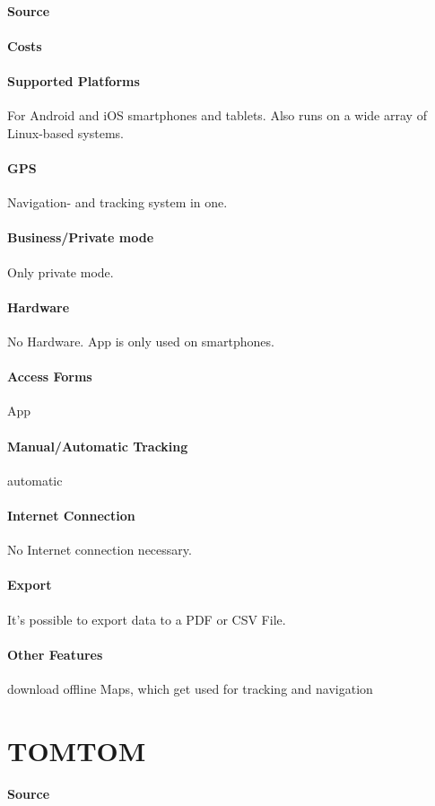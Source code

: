 \paragraph{Source} 
\paragraph{Costs} 
\paragraph{Supported Platforms} For Android and iOS smartphones and tablets. Also runs on a wide array of Linux-based systems.
\paragraph{GPS} Navigation- and tracking  system in one.
\paragraph{Business/Private mode} Only private mode.
\paragraph{Hardware} No Hardware. App is only used on smartphones.
\paragraph{Access Forms} App
\paragraph{Manual/Automatic Tracking} automatic
\paragraph{Internet Connection} No Internet connection necessary.
\paragraph{Export} It’s possible to export data to a PDF or CSV File.
\paragraph{Other Features} download offline Maps, which get used for tracking and navigation
\newpage
\section{TOMTOM}
\paragraph{Source} 
